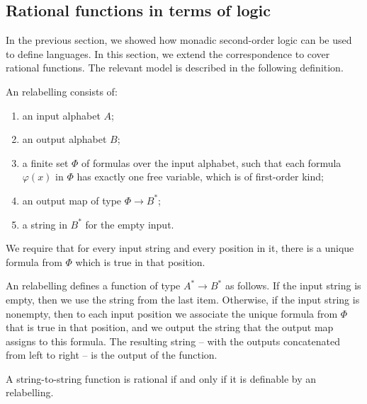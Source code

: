 \subsection{Rational functions in terms of logic}
In the previous section, we showed how monadic second-order logic can be used to define languages. In this section, we extend the correspondence to cover rational functions. The relevant model is described in the following definition. 
\begin{definition}\label{def:mso-relabeling}
    An \mso relabelling consists of: 
    \begin{enumerate}
        \item an input alphabet $A$;
        \item an output alphabet $B$;
        \item \label{item:mso-relabeling-formulas} a finite set $\Phi$ of \mso formulas over the input alphabet, such that each formula $\varphi(x)$ in $\Phi$ has exactly one free variable, which is of first-order kind;
        \item \label{item:mso-relabeling-output-map} an output map of type $\Phi \to B^*$;
        \item  \label{item:mso-relabeling-empty-input} a string in $B^*$ for the empty input.
    \end{enumerate}
    We require that for  every input string  and every position  in it, there is a unique formula from $\Phi$ which is true in that position.
\end{definition}

An \mso relabelling defines a function of type $A^* \to B^*$ as follows. If the input string is empty, then we use the string from the last item. Otherwise, if the input string is nonempty, then to each input position we associate the unique formula from $\Phi$ that is true in that position, and we output the string that the output map assigns to this formula. The resulting string -- with the outputs concatenated from left to right -- is the output of the function. 

\begin{theorem}
    \label{thm:logic-rational-functions}
    A string-to-string function is rational if and only if it is definable by an \mso relabelling.
\end{theorem}


